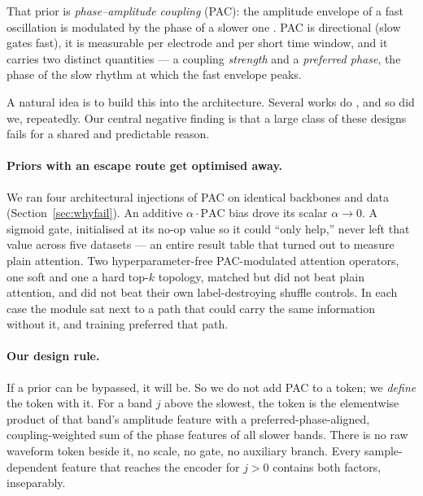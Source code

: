 \documentclass{article}
\begin{document}
That prior is \emph{phase--amplitude coupling} (PAC): the amplitude envelope of a
fast oscillation is modulated by the phase of a slower one
\citep{canolty2006high,tort2010measuring}. PAC is directional (slow gates fast),
it is measurable per electrode and per short time window, and it carries two
distinct quantities --- a coupling \emph{strength} and a \emph{preferred phase},
the phase of the slow rhythm at which the fast envelope peaks.

A natural idea is to build this into the architecture. Several works do
\citep{lemkhenter2020phaseswap,li2023pacnet,li2023complexpac,lee2026sleeppacnet},
and so did we, repeatedly. Our central negative finding is that a large class of
these designs fails for a shared and predictable reason.

\paragraph{Priors with an escape route get optimised away.}
We ran four architectural injections of PAC on identical backbones and data
(Section~\ref{sec:whyfail}). An additive $\alpha \cdot \mathrm{PAC}$ bias drove
its scalar $\alpha \to 0$. A sigmoid gate, initialised at its no-op value so it
could ``only help,'' never left that value across five datasets --- an entire
result table that turned out to measure plain attention. Two hyperparameter-free
PAC-modulated attention operators, one soft and one a hard top-$k$ topology,
matched but did not beat plain attention, and did not beat their own
label-destroying shuffle controls. In each case the module sat next to a path
that could carry the same information without it, and training preferred that
path.

\paragraph{Our design rule.}
If a prior can be bypassed, it will be. So we do not add PAC to a token; we
\emph{define} the token with it. For a band $j$ above the slowest, the token is
the elementwise product of that band's amplitude feature with a
preferred-phase-aligned, coupling-weighted sum of the phase features of all
slower bands. There is no raw waveform token beside it, no scale, no gate, no
auxiliary branch. Every sample-dependent feature that reaches the encoder for
$j>0$ contains both factors, inseparably.
\end{document}
